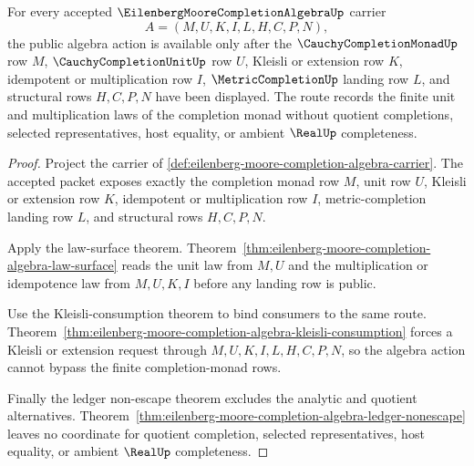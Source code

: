 \begin{theorem}
\label{thm:eilenberg-moore-completion-algebra-unit-multiplication-laws}
For every accepted $\EilenbergMooreCompletionAlgebraUp$ carrier
$$
A=(M,U,K,I,L,H,C,P,N),
$$
the public algebra action is available only after the $\CauchyCompletionMonadUp$ row $M$, $\CauchyCompletionUnitUp$ row $U$, Kleisli or extension row $K$, idempotent or multiplication row $I$, $\MetricCompletionUp$ landing row $L$, and structural rows $H,C,P,N$ have been displayed. The route records the finite unit and multiplication laws of the completion monad without quotient completions, selected representatives, host equality, or ambient $\RealUp$ completeness.
\end{theorem}
\begin{proof}
Project the carrier of \autoref{def:eilenberg-moore-completion-algebra-carrier}. The accepted packet exposes exactly the completion monad row $M$, unit row $U$, Kleisli or extension row $K$, idempotent or multiplication row $I$, metric-completion landing row $L$, and structural rows $H,C,P,N$.

Apply the law-surface theorem. Theorem~\ref{thm:eilenberg-moore-completion-algebra-law-surface} reads the unit law from $M,U$ and the multiplication or idempotence law from $M,U,K,I$ before any landing row is public.

Use the Kleisli-consumption theorem to bind consumers to the same route. Theorem~\ref{thm:eilenberg-moore-completion-algebra-kleisli-consumption} forces a Kleisli or extension request through $M,U,K,I,L,H,C,P,N$, so the algebra action cannot bypass the finite completion-monad rows.

Finally the ledger non-escape theorem excludes the analytic and quotient alternatives. Theorem~\ref{thm:eilenberg-moore-completion-algebra-ledger-nonescape} leaves no coordinate for quotient completion, selected representatives, host equality, or ambient $\RealUp$ completeness.
\end{proof}

